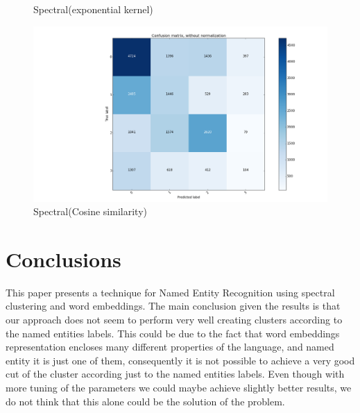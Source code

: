 \documentclass[]{article}
\begin{document}
\begin{figure}
\begin{minipage}[b]{0.5\linewidth}
			\caption{\label{fig:confusionE}Spectral(exponential kernel)} 
			\vspace{4ex}
		\end{minipage}%
		\begin{minipage}[b]{0.5\linewidth}
			\centering
			\includegraphics[width=1\linewidth]{Figures_Mik/cosSimConfMat2.png} 
			\caption{\label{fig:confusionC}Spectral(Cosine similarity)} 
			\vspace{4ex}
		\end{minipage} 
	\end{figure}
	
	
	\section{Conclusions}
	This paper presents a technique for Named Entity Recognition using spectral clustering and word embeddings. The main conclusion given the results is that our approach does not seem to perform very well creating clusters according to the named entities labels. This could be due to the fact that word embeddings representation encloses many different properties of the language, and named entity it is just one of them, consequently it is not possible to achieve a very good cut of the cluster according just to the named entities labels. Even though with more tuning of the parameters we could maybe achieve slightly better results, we do not think that this alone could be the solution of the problem. 
	
	
	

	
	\pagestyle{myheadings}
	\thispagestyle{plain}
	
\end{document}
